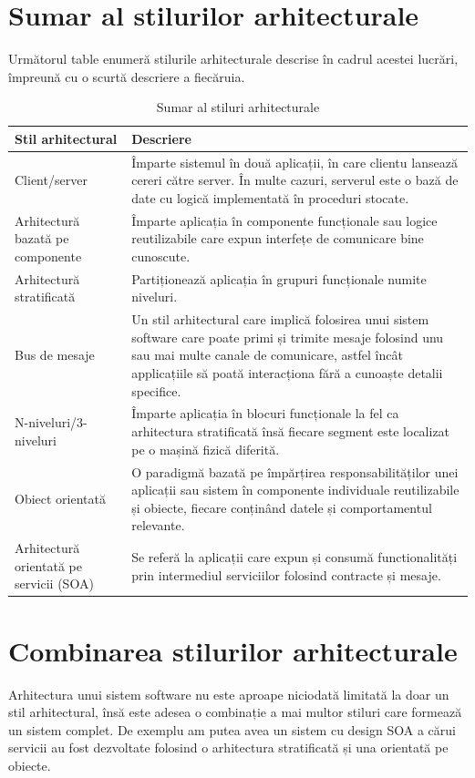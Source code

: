 \documentclass[12pt, a4paper, oneside, romanian]{teza-upb}
\begin{document}
\section{Sumar al stilurilor arhitecturale}
Următorul table enumeră stilurile arhitecturale descrise în cadrul acestei lucrări, împreună cu o scurtă descriere a fiecăruia.
\begin{table}[ht]
\centering
    \begin{tabular}{| p{3cm} | p{10cm} |}
    \hline  
    Stil arhitectural & Descriere \\ \hline
    	Client/server & 
    	Împarte sistemul în două aplicații, în care clientu lansează cereri către server. În multe cazuri, serverul este o bază de date cu logică implementată în proceduri stocate. \\ \hline
    Arhitectură bazată pe componente &
    Împarte aplicația în componente funcționale sau logice reutilizabile care expun interfețe de comunicare bine cunoscute. \\ \hline
	Arhitectură stratificată &
	Partiționează aplicația în grupuri funcționale numite niveluri. \\ \hline
	Bus de mesaje & 
	Un stil arhitectural care implică folosirea unui sistem software care poate primi și trimite mesaje folosind unu sau mai multe canale de comunicare, astfel încât applicațiile să poată interacționa fără a cunoaște detalii specifice. \\\hline
	N-niveluri/3-niveluri &
	Împarte	aplicația în blocuri funcționale la fel ca arhitectura stratificată însă fiecare segment este localizat pe o mașină fizică diferită.
	\\ \hline
	Obiect orientată &
	O paradigmă bazată pe împărțirea responsabilităților unei aplicații sau sistem în componente individuale reutilizabile și obiecte, fiecare conținând datele și comportamentul relevante. \\ \hline
	Arhitectură orientată pe servicii (SOA) &
 	Se referă la aplicații care expun și consumă functionalități prin intermediul serviciilor folosind contracte și mesaje. \\ \hline
    \end{tabular}
    \label{altebasme}
\caption{Sumar al stiluri arhitecturale}
\end{table}

\section{Combinarea stilurilor arhitecturale}
Arhitectura unui sistem software nu este aproape niciodată limitată la doar un stil arhitectural, însă este adesea o combinație a mai multor stiluri care formează un sistem complet. De exemplu am putea avea un sistem cu design SOA a cărui servicii au fost dezvoltate folosind o arhitectura stratificată și una orientată pe obiecte.
\end{document}
